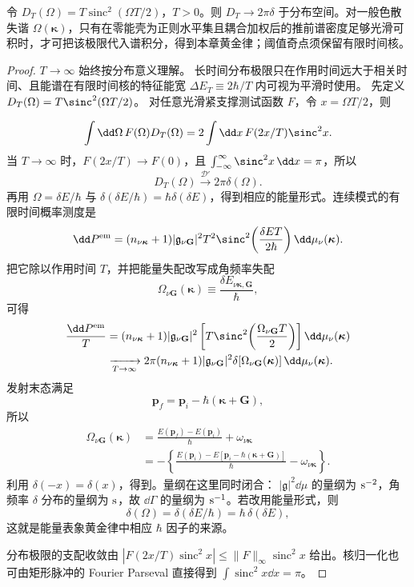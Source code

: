 \begin{lemma}
令 $D_T(\Omega)=T\operatorname{sinc}^2(\Omega T/2)$，$T>0$。则 $D_T\to2\pi\delta$ 于分布空间。对一般色散失谐 $\Omega(\boldsymbol\kappa)$，只有在零能壳为正则水平集且耦合加权后的推前谱密度足够光滑可积时，才可把该极限代入谱积分，得到本章黄金律；阈值奇点须保留有限时间核。
\end{lemma}
\begin{proof}
$T\to\infty$ 始终按分布意义理解。 长时间分布极限只在作用时间远大于相关时间、且能谱在有限时间核的特征能宽 $\Delta E_T\equiv 2\hbar/T$ 内可视为平滑时使用。 先定义
$D_T(\Omega)=T\sinc^2(\Omega T/2)$。 对任意光滑紧支撑测试函数 $F$，令 $x=\Omega T/2$，则

\[
\int\dd\Omega\,F(\Omega)D_T(\Omega)
=2\int\dd x\,F(2x/T)\sinc^2x.
\]
当 $T\to\infty$ 时，$F(2x/T)\to F(0)$，且
$\int_{-\infty}^{\infty}\sinc^2x\,\dd x=\pi$，所以
\[
D_T(\Omega)\xrightarrow{\mathcal D'}2\pi\delta(\Omega).
\]
再用 $\Omega=\delta E/\hbar$ 与
$\delta(\delta E/\hbar)=\hbar\delta(\delta E)$，得到相应的能量形式。连续模式的有限时间概率测度是
\[
\dd P^{\rm em}
=(n_{\nu\boldsymbol\kappa}+1)|\mathfrak g_{\nu\mathbf G}|^2T^2
\sinc^2\!\left(\frac{\delta E T}{2\hbar}\right)
\dd\mu_\nu(\boldsymbol\kappa).
\]
把它除以作用时间 $T$，并把能量失配改写成角频率失配
\[
\Omega_{\nu\mathbf G}(\boldsymbol\kappa)
\equiv\frac{\delta E_{\nu\boldsymbol\kappa,\mathbf G}}{\hbar},
\]
可得
\begin{align*}
\frac{\dd P^{\rm em}}{T}
&=(n_{\nu\boldsymbol\kappa}+1)|\mathfrak g_{\nu\mathbf G}|^2
\left[T\sinc^2\!\left(\frac{\Omega_{\nu\mathbf G}T}{2}\right)\right]
\dd\mu_\nu(\boldsymbol\kappa)\\
&\xrightarrow[T\to\infty]{}
2\pi(n_{\nu\boldsymbol\kappa}+1)|\mathfrak g_{\nu\mathbf G}|^2
\delta\!\left[\Omega_{\nu\mathbf G}(\boldsymbol\kappa)\right]
\dd\mu_\nu(\boldsymbol\kappa).
\end{align*}
发射末态满足
\[
\mathbf p_f=\mathbf p_i-\hbar(\boldsymbol\kappa+\mathbf G),
\]
所以
\begin{align*}
\Omega_{\nu\mathbf G}(\boldsymbol\kappa)
&=\frac{E(\mathbf p_f)-E(\mathbf p_i)}{\hbar}
+\omega_{\nu\boldsymbol\kappa}\\
&=-\left\{
\frac{E(\mathbf p_i)-E[\mathbf p_i-\hbar(\boldsymbol\kappa+\mathbf G)]}{\hbar}
-\omega_{\nu\boldsymbol\kappa}
\right\}.
\end{align*}
利用 $\delta(-x)=\delta(x)$，得到。量纲在这里同时闭合：
$|\mathfrak g|^2\dd\mu$ 的量纲为 ${\rm s^{-2}}$，角频率 $\delta$ 分布的量纲为 ${\rm s}$，故 $\dd\Gamma$ 的量纲为 ${\rm s^{-1}}$。若改用能量形式，则
\[
\delta(\Omega)=\delta(\delta E/\hbar)
=\hbar\,\delta(\delta E),
\]
这就是能量表象黄金律中相应 $\hbar$ 因子的来源。

分布极限的支配收敛由 $|F(2x/T)\operatorname{sinc}^2x|\le\|F\|_\infty\operatorname{sinc}^2x$ 给出。核归一化也可由矩形脉冲的 Fourier Parseval 直接得到 $\int\operatorname{sinc}^2x\dd x=\pi$。
\end{proof}


